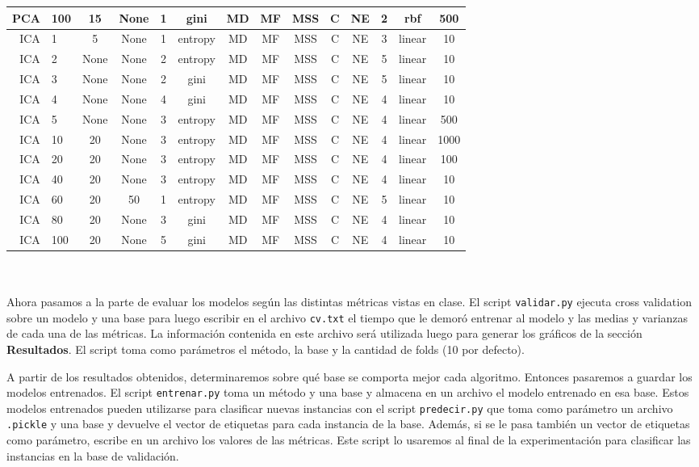 \documentclass[10pt, a4paper]{article}
\begin{document}
\begin{scriptsize}
\begin{tabular}{|r|l||c|c|c|c||c|c|c|c|c||c||c|c|}
PCA & 100 & 15 & None & 1 & gini & MD & MF & MSS & C & NE & 2 & rbf & 500 \\
\hline
ICA & 1 & 5 & None & 1 & entropy & MD & MF & MSS & C & NE & 3 & linear & 10 \\
\hline
ICA & 2 & None & None & 2 & entropy & MD & MF & MSS & C & NE & 5 & linear & 10 \\
\hline
ICA & 3 & None & None & 2 & gini & MD & MF & MSS & C & NE & 5 & linear & 10 \\
\hline
ICA & 4 & None & None & 4 & gini & MD & MF & MSS & C & NE & 4 & linear & 10 \\
\hline
ICA & 5 & None & None & 3 & entropy & MD & MF & MSS & C & NE & 4 & linear & 500 \\
\hline
ICA & 10 & 20 & None & 3 & entropy & MD & MF & MSS & C & NE & 4 & linear & 1000 \\
\hline
ICA & 20 & 20 & None & 3 & entropy & MD & MF & MSS & C & NE & 4 & linear & 100 \\
\hline
ICA & 40 & 20 & None & 3 & entropy & MD & MF & MSS & C & NE & 4 & linear & 10 \\
\hline
ICA & 60 & 20 & 50 & 1 & entropy & MD & MF & MSS & C & NE & 5 & linear & 10 \\
\hline
ICA & 80 & 20 & None & 3 & gini & MD & MF & MSS & C & NE & 4 & linear & 10 \\
\hline
ICA & 100 & 20 & None & 5 & gini & MD & MF & MSS & C & NE & 4 & linear & 10 \\
\hline
\end{tabular}
\end{scriptsize}
\\\\
Ahora pasamos a la parte de evaluar los modelos según las distintas métricas vistas en clase. El script \texttt{validar.py} ejecuta cross validation sobre un modelo y una base para luego escribir en el archivo \texttt{cv.txt} el tiempo que le demoró entrenar al modelo y las medias y varianzas de cada una de las métricas. La información contenida en este archivo será utilizada luego para generar los gráficos de la sección \textbf{Resultados}. El script toma como parámetros el método, la base y la cantidad de folds (10 por defecto).

A partir de los resultados obtenidos, determinaremos sobre qué base se comporta mejor cada algoritmo. Entonces pasaremos a guardar los modelos entrenados. El script \texttt{entrenar.py} toma un método y una base y almacena en un archivo el modelo entrenado en esa base. Estos modelos entrenados pueden utilizarse para clasificar nuevas instancias con el script \texttt{predecir.py} que toma como parámetro un archivo \texttt{.pickle} y una base y devuelve el vector de etiquetas para cada instancia de la base. Además, si se le pasa también un vector de etiquetas como parámetro, escribe en un archivo los valores de las métricas. Este script lo usaremos al final de la experimentación para clasificar las instancias en la base de validación.
\end{document}
